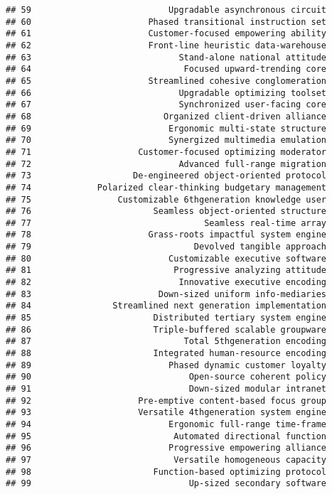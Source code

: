 \documentclass[
]{article}
\begin{document}
\begin{verbatim}
## 59                           Upgradable asynchronous circuit
## 60                       Phased transitional instruction set
## 61                       Customer-focused empowering ability
## 62                       Front-line heuristic data-warehouse
## 63                             Stand-alone national attitude
## 64                              Focused upward-trending core
## 65                       Streamlined cohesive conglomeration
## 66                             Upgradable optimizing toolset
## 67                             Synchronized user-facing core
## 68                          Organized client-driven alliance
## 69                           Ergonomic multi-state structure
## 70                           Synergized multimedia emulation
## 71                     Customer-focused optimizing moderator
## 72                             Advanced full-range migration
## 73                    De-engineered object-oriented protocol
## 74             Polarized clear-thinking budgetary management
## 75                 Customizable 6thgeneration knowledge user
## 76                        Seamless object-oriented structure
## 77                                  Seamless real-time array
## 78                       Grass-roots impactful system engine
## 79                                Devolved tangible approach
## 80                           Customizable executive software
## 81                            Progressive analyzing attitude
## 82                             Innovative executive encoding
## 83                         Down-sized uniform info-mediaries
## 84                Streamlined next generation implementation
## 85                        Distributed tertiary system engine
## 86                        Triple-buffered scalable groupware
## 87                              Total 5thgeneration encoding
## 88                        Integrated human-resource encoding
## 89                           Phased dynamic customer loyalty
## 90                               Open-source coherent policy
## 91                               Down-sized modular intranet
## 92                     Pre-emptive content-based focus group
## 93                     Versatile 4thgeneration system engine
## 94                           Ergonomic full-range time-frame
## 95                            Automated directional function
## 96                           Progressive empowering alliance
## 97                            Versatile homogeneous capacity
## 98                        Function-based optimizing protocol
## 99                               Up-sized secondary software

\end{verbatim}
\end{document}
